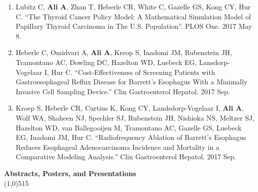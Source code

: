 \documentclass{article}
\newcommand{\s}[1]{\vspace{4mm} \noindent \large \textbf{#1} \\[-2.5mm] \linethickness{0.2mm} \line(1,0){515}}
\begin{document}
\begin{enumerate}
		\item Lubitz C, \textbf{Ali A}, Zhan T, Heberle CR, White C, Gazelle GS, Kong CY, Hur C. ``The Thyroid Cancer Policy Model: A Mathematical Simulation Model of Papillary Thyroid Carcinoma in The U.S. Population''. PLOS One. 2017 May 8.		
		
		\item Heberle C, Omidvari A, \textbf{Ali A}, Kreop S, Inadomi JM, Rubenstein JH, Tramontano AC, Dowling DC, Hazelton WD, Luebeck EG, Lansdorp-Vogelaar I, Hur C.  ``Cost-Effectiveness of Screening Patients with Gastroesophageal Reflux Disease for Barrett's Esophagus With a Minimally Invasive Cell Sampling Device.'' Clin Gastroenterol Hepatol. 2017 Sep.
		
		\item Kroep S, Heberle CR, Curtius K, Kong CY, Landsdorp-Vogelaar I, \textbf{Ali A},  Wolf WA, Shaheen NJ, Spechler SJ, Rubenstein JH, Nishioka NS, Meltzer SJ, Hazelton WD, van Ballegooijen M, Tramontano AC, Gazelle GS, Luebeck EG, Inadomi JM, Hur C. ``Radiofrequency Ablation of Barrett's Esophagus Reduces Esophageal Adenocarcinoma Incidence and Mortality in a Comparative Modeling Analysis." Clin Gastroenterol Hepatol. 2017 Sep.
		
	\end{enumerate}

	\vspace{-2.5mm}

\s{Abstracts, Posters, and Presentations}
	
\end{document}
